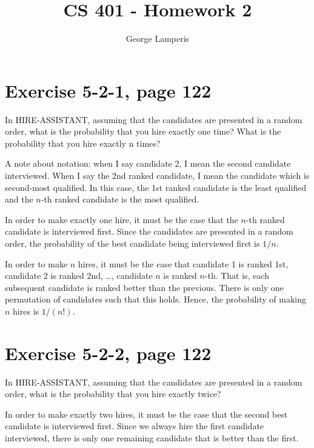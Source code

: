 \documentclass[letterpaper, 12pt, oneside]{memoir}
\title{CS 401 - Homework 2}
\author{George Lamperis}
\date{}
\begin{document}
\maketitle

\section*{Exercise 5-2-1, page 122}
In HIRE-ASSISTANT, assuming that the candidates are presented in a random order,
what is the probability that you hire exactly one time? What is the probability
that you hire exactly n times?


A note about notation: when I say candidate 2, I mean the second candidate
interviewed. When I say the 2nd ranked candidate, I mean the candidate which is
second-most qualified. In this case, the 1st ranked candidate is the least 
qualified and the $n$-th ranked candidate is the most qualified. 


In order to make exactly one hire, it must be the case that the $n$-th ranked
candidate is interviewed first. Since the candidates are presented in a random
order, the probability of the best candidate being interviewed first is $1/n$.

In order to make $n$ hires, it must be the case that candidate 1 is ranked 1st,
candidate 2 is ranked 2nd, \ldots, candidate $n$ is ranked $n$-th. That is,
each subsequent candidate is ranked better than the previous. There is only one 
permutation of candidates such that this holds. Hence, the probability of making
$n$ hires is $1/(n!)$.

\section*{Exercise 5-2-2, page 122}
In HIRE-ASSISTANT, assuming that the candidates are presented in a random order,
what is the probability that you hire exactly twice?

In order to make exactly two hires, it must be the case that the second best
candidate is interviewed first. Since we always hire the first candidate
interviewed, there is only one remaining candidate that is better than the
first.
\end{document}
